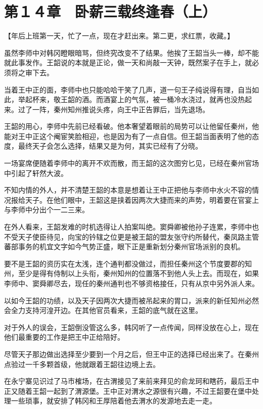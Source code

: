 \section{第１４章　卧薪三载终逢春（上）}

【年后上班第一天，忙了一点，现在才赶出来。第二更，求红票，收藏。】

虽然李师中对韩冈瞪眼暗骂，但终究改变不了结果。他挨了王韶当头一棒，却不能就此事发作。王韶说的本就是正论，做一天和尚敲一天钟，既然案子在手上，就必须将之审下去。

当着王中正的面，李师中也只能哈哈干笑了几声，道一句王子纯说得有理，自当如此，举起杯来，敬王韶的酒。而酒宴上的气氛，被一桶冷水浇过，就再也没热起来。过了一阵，秦州知州推说头疼，向王中正告罪后，当先退场。

王韶的用心，李师中先前已经看破。他本奢望着眼前的局势可以让他留任秦州，他能对王中正这个阉宦笑脸相迎，也是因为有了一点自信。但王韶当面表明了他的态度，最终天子会怎么选择，结果又是为何，其实已经有了分晓。

一场宴席便随着李师中的离开不欢而散，而王韶的这次图穷匕见，已经在秦州官场中引起了轩然大波。

不知内情的外人，并不清楚王韶的本意是想着让王中正把他与李师中水火不容的情况报给天子。在他们眼中，王韶这是挟着因两次大捷而来的声势，明着要在官宴上与李师中分出个一二三来。

在外人看来，王韶发难的时机选得让人拍案叫绝。窦舜卿被他孙子连累，李师中也不受天子使臣待见，向宝的钤辖之位更是被王韶的盟友张守约所替代，秦凤路主管蕃部事务的机宜文字如今气势正盛，眼下正是重新划分秦州官场派别的良机。

要不是王韶的资历实在太浅，连个通判都没做过，而担任秦州这个节度要郡的知州，至少是得有侍制以上头衔，秦州知州的位置落不到他人头上去。而现在，如果李师中、窦舜卿尽去，现任的秦州通判也不够资格接任，只有从京中另外派人来。

以如今王韶的功绩，以及天子因两次大捷而被吊起来的胃口，派来的新任知州必然会全力支持河湟开边。在其他官员看来，王韶的底气就在这里。

对于外人的误会，王韶倒没管这么多，韩冈听了一点传闻，同样没放在心上，现在他们最重要的工作是把王中正给陪好。

尽管天子那边做出选择至少要到一个月之后，但王中正的选择已经出来了。在秦州点验过一千多颗首级，他就跟着王韶往边境上去。

在永宁寨见识过了马市榷场，在古渭接见了来前来拜见的俞龙珂和瞎药，最后王中正又随着王韶一起到了渭源堡。王中正对渭水之源很有兴趣，不过王韶要在堡中处理一些琐事，就安排了韩冈和王厚陪着他去渭水的发源地去走一走。

